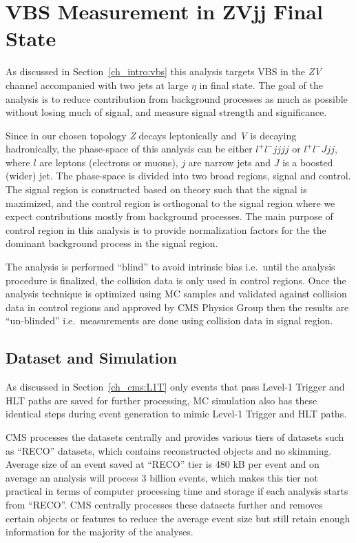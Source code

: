 \chapter{
  VBS Measurement in ZVjj Final State
 }\label{ch_vbs}

As discussed in Section~\ref{ch_intro:vbs} this analysis targets
\gls{VBS} in the \textit{ZV} channel accompanied with two jets at large \( \eta \) in final state. The goal of the analysis
is to reduce contribution from background processes as much as possible
without losing much of signal, and measure signal strength and significance.

Since in our chosen topology \textit{Z} decays leptonically and \textit{V} is decaying hadronically,
the phase-space of this analysis can be either
\( l^+ l^- jjjj \) or \( l^+ l^- J jj\), where \( l \) are leptons (electrons
or muons),
\( j \) are narrow jets and \( J \) is a boosted (wider) jet.
The phase-space is divided into two broad regions, signal and control.
The signal region is constructed based on theory such that the signal is maximized,
and the control region is orthogonal to the signal region
where we expect contributions mostly from background processes.
The main purpose of control region
in this analysis is to
provide normalization factors for the the dominant background
process in the signal region.

The analysis is performed ``blind'' to avoid intrinsic bias
i.e.\ until the analysis procedure is finalized, the collision data is only used
in control regions. Once the analysis technique is optimized using \gls{MC}
samples and validated against collision data in control regions and
approved by \gls{CMS} Physics Group
then the results are ``un-blinded'' i.e.\ measurements are done
using collision data in signal region.

\section{
  Dataset and Simulation
 }

As discussed in Section~\ref{ch_cms:L1T} only events that pass Level-1
Trigger and \gls{HLT} paths are saved for further processing, \gls{MC}
simulation also has these identical steps during event generation to mimic
Level-1 Trigger and \gls{HLT} paths.

\gls{CMS} processes the datasets centrally and provides various
tiers of datasets such as ``RECO'' datasets, which contains reconstructed
objects and no skimming. Average size of an event saved at ``RECO'' tier is
480 kB per event and on average an analysis will process
3 billion events, which makes this tier not practical in terms of computer processing
time and storage if each analysis starts from ``RECO''. \gls{CMS} centrally
processes these datasets further and removes certain objects
or features to reduce the average event size but still retain enough information for the
majority of the analyses.

